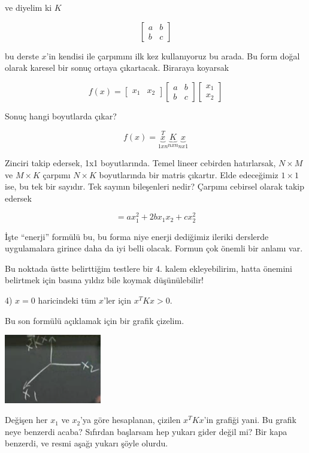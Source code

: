 \documentclass[12pt,fleqn]{article}\usepackage{../../common}
\begin{document}
ve diyelim ki $K$

$$ 
\left[\begin{array}{rr}
a & b \\
b & c
\end{array}\right]
 $$

bu derste $x$'in kendisi ile çarpımını ilk kez kullanıyoruz bu arada. Bu
form doğal olarak karesel bir sonuç ortaya çıkartacak. Biraraya koyarsak

$$ f(x) =
\left[\begin{array}{rr}
x_1 & x_2 
\end{array}\right]
\left[\begin{array}{rr}
a & b \\
b & c
\end{array}\right]
\left[\begin{array}{r}
x_1 \\ x_2 
\end{array}\right]
 $$

Sonuç hangi boyutlarda çıkar?

$$ f(x) = \underbrace{x}_{1xn}^T\underbrace{K}_{nxn}\underbrace{x}_{nx1} $$

Zinciri takip edersek, 1x1 boyutlarında. Temel lineer cebirden hatırlarsak,
$N \times M$ ve $M \times K$ çarpımı $N \times K$ boyutlarında bir matris
çıkartır. Elde edeceğimiz $1 \times 1$ ise, bu tek bir sayıdır. Tek sayının
bileşenleri nedir? Çarpımı cebirsel olarak takip edersek

$$ = ax_1^2 + 2bx_1x_2 + cx_2^2 $$

İşte ``enerji'' formülü bu, bu forma niye enerji dediğimiz ileriki
derslerde uygulamalara girince daha da iyi belli olacak. Formun çok önemli
bir anlamı var. 

Bu noktada üstte belirttiğim testlere bir 4. kalem ekleyebilirim, hatta
önemini belirtmek için basına yıldız bile koymak düşünülebilir!

4) $x=0$ haricindeki tüm $x$'ler için $x^TKx > 0$.

Bu son formülü açıklamak için bir grafik çizelim. 

\includegraphics[height=3cm]{7_2.png}

Değişen her $x_1$ ve $x_2$'ya göre hesaplanan, çizilen $x^TKx$'in grafiği
yani. Bu grafik neye benzerdi acaba? Sıfırdan başlarsam hep yukarı gider
değil mi? Bir kapa benzerdi, ve resmi aşağı yukarı şöyle olurdu. 
\end{document}
